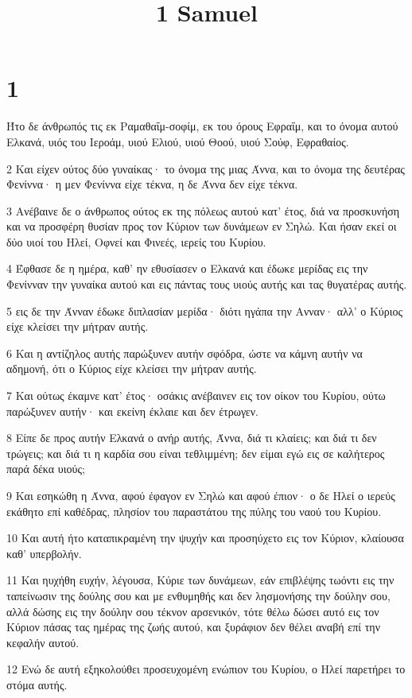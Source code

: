 

\title{1 Samuel}


\chapter{1}

\par Ήτο δε άνθρωπός τις εκ Ραμαθαΐμ-σοφίμ, εκ του όρους Εφραΐμ, και το όνομα αυτού Ελκανά, υιός του Ιεροάμ, υιού Ελιού, υιού Θοού, υιού Σούφ, Εφραθαίος.
\par 2 Και είχεν ούτος δύο γυναίκας· το όνομα της μιας Άννα, και το όνομα της δευτέρας Φενίννα· η μεν Φενίννα είχε τέκνα, η δε Άννα δεν είχε τέκνα.
\par 3 Ανέβαινε δε ο άνθρωπος ούτος εκ της πόλεως αυτού κατ' έτος, διά να προσκυνήση και να προσφέρη θυσίαν προς τον Κύριον των δυνάμεων εν Σηλώ. Και ήσαν εκεί οι δύο υιοί του Ηλεί, Οφνεί και Φινεές, ιερείς του Κυρίου.
\par 4 Έφθασε δε η ημέρα, καθ' ην εθυσίασεν ο Ελκανά και έδωκε μερίδας εις την Φενίνναν την γυναίκα αυτού και εις πάντας τους υιούς αυτής και τας θυγατέρας αυτής.
\par 5 εις δε την Άνναν έδωκε διπλασίαν μερίδα· διότι ηγάπα την Ανναν· αλλ' ο Κύριος είχε κλείσει την μήτραν αυτής.
\par 6 Και η αντίζηλος αυτής παρώξυνεν αυτήν σφόδρα, ώστε να κάμνη αυτήν να αδημονή, ότι ο Κύριος είχε κλείσει την μήτραν αυτής.
\par 7 Και ούτως έκαμνε κατ' έτος· οσάκις ανέβαινεν εις τον οίκον του Κυρίου, ούτω παρώξυνεν αυτήν· και εκείνη έκλαιε και δεν έτρωγεν.
\par 8 Είπε δε προς αυτήν Ελκανά ο ανήρ αυτής, Άννα, διά τι κλαίεις; και διά τι δεν τρώγεις; και διά τι η καρδία σου είναι τεθλιμμένη; δεν είμαι εγώ εις σε καλήτερος παρά δέκα υιούς;
\par 9 Και εσηκώθη η Άννα, αφού έφαγον εν Σηλώ και αφού έπιον· ο δε Ηλεί ο ιερεύς εκάθητο επί καθέδρας, πλησίον του παραστάτου της πύλης του ναού του Κυρίου.
\par 10 Και αυτή ήτο καταπικραμένη την ψυχήν και προσηύχετο εις τον Κύριον, κλαίουσα καθ' υπερβολήν.
\par 11 Και ηυχήθη ευχήν, λέγουσα, Κύριε των δυνάμεων, εάν επιβλέψης τωόντι εις την ταπείνωσιν της δούλης σου και με ενθυμηθής και δεν λησμονήσης την δούλην σου, αλλά δώσης εις την δούλην σου τέκνον αρσενικόν, τότε θέλω δώσει αυτό εις τον Κύριον πάσας τας ημέρας της ζωής αυτού, και ξυράφιον δεν θέλει αναβή επί την κεφαλήν αυτού.
\par 12 Ενώ δε αυτή εξηκολούθει προσευχομένη ενώπιον του Κυρίου, ο Ηλεί παρετήρει το στόμα αυτής.
